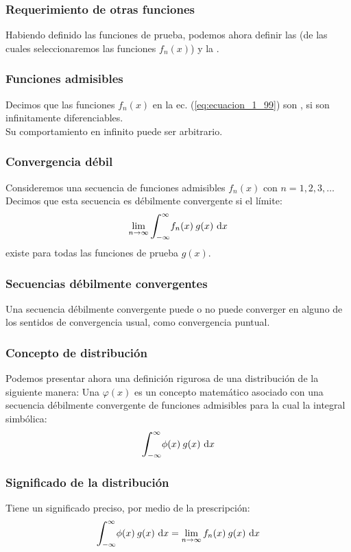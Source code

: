 \documentclass[12pt]{beamer}
\begin{document}
\begin{frame}
\frametitle{Requerimiento de otras funciones}
Habiendo definido las funciones de prueba, podemos ahora definir las  (de las cuales seleccionaremos las funciones $f_{n}( x)$) y la .
\end{frame}

\begin{frame}
\frametitle{Funciones admisibles}
Decimos que las funciones $f_{n} (x)$ en la ec. (\ref{eq:ecuacion_1_99}) son , si son infinitamente diferenciables.
\\
\bigskip
\pause
Su comportamiento en infinito puede ser arbitrario.
\end{frame}

\begin{frame}
\frametitle{Convergencia débil}
Consideremos una secuencia de funciones admisibles $f_{n} (x)$ con $n = 1, 2, 3, \ldots$
\\
\bigskip
\pause
Decimos que esta secuencia es débilmente convergente si el límite:
\pause
\begin{equation}
\lim_{n \to \infty} \scaleint{6ex}_{\bs -\infty}^{\infty} f_{n}(x) \:  g (x) \, \dd{x}
\label{eq:ecuacion_1_100}
\end{equation}
existe para todas las funciones de prueba $g (x)$.
\end{frame}

\begin{frame}
\frametitle{Secuencias débilmente convergentes}
Una secuencia débilmente convergente puede o no puede converger en alguno de los sentidos de convergencia usual, como convergencia puntual.
\end{frame}

\begin{frame}
\frametitle{Concepto de distribución}
Podemos presentar ahora una definición rigurosa de una distribución de la siguiente manera:
\pause
Una  $\varphi (x)$ es un concepto matemático asociado con una secuencia débilmente convergente de funciones admisibles para la cual la integral simbólica:
\pause
\begin{equation}
\scaleint{6ex}_{\bs -\infty}^{\infty} \phi (x) \:  g (x) \, \dd{x}
\label{eq:ecuacion_1_101}
\end{equation}
\end{frame}

\begin{frame}
\frametitle{Significado de la distribución}
Tiene un significado preciso, por medio de la prescripción:
\pause
\begin{equation}
\scaleint{6ex}_{\bs -\infty}^{\infty} \phi (x) \: g (x) \, \dd{x} = \lim_{n \to \infty} f_{n} (x) \: g (x) \, \dd{x}
\label{eq:ecuacion_1_102}
\end{equation}
\end{frame}
\end{document}
